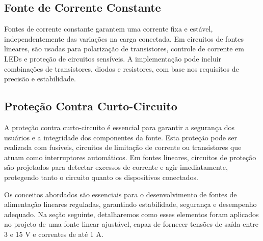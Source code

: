 \subsection{Fonte de Corrente Constante}  
Fontes de corrente constante garantem uma corrente fixa e estável, independentemente das variações na carga conectada. Em circuitos de fontes lineares, são usadas para polarização de transistores, controle de corrente em LEDs e proteção de circuitos sensíveis. A implementação pode incluir combinações de transistores, diodos e resistores, com base nos requisitos de precisão e estabilidade.  

\subsection{Proteção Contra Curto-Circuito}  
A proteção contra curto-circuito é essencial para garantir a segurança dos usuários e a integridade dos componentes da fonte. Esta proteção pode ser realizada com fusíveis, circuitos de limitação de corrente ou transistores que atuam como interruptores automáticos. Em fontes lineares, circuitos de proteção são projetados para detectar excessos de corrente e agir imediatamente, protegendo tanto o circuito quanto os dispositivos conectados.  

Os conceitos abordados são essenciais para o desenvolvimento de fontes de alimentação lineares reguladas, garantindo estabilidade, segurança e desempenho adequado. Na seção seguinte, detalharemos como esses elementos foram aplicados no projeto de uma fonte linear ajustável, capaz de fornecer tensões de saída entre 3 e 15 V e correntes de até 1 A.  
